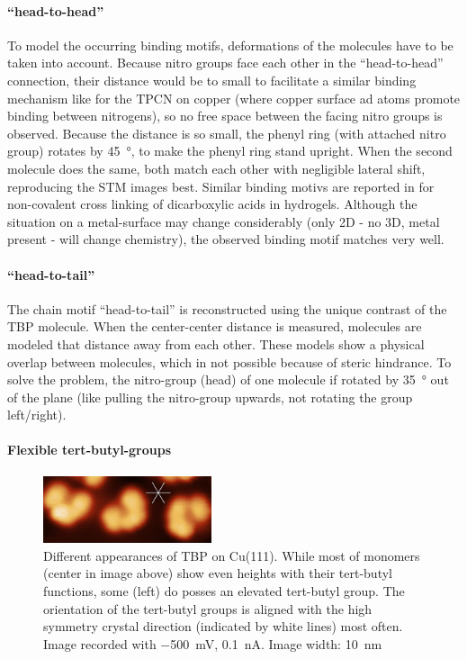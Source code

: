 	\paragraph{``head-to-head''}
	To model the occurring binding motifs, deformations of the molecules have to be taken into account. Because nitro groups face each other in the ``head-to-head'' connection, their distance would be to small to facilitate a similar binding mechanism like for the TPCN on copper (where copper surface ad atoms promote binding between nitrogens), so no free space between the facing nitro groups is observed. Because the distance is so small, the phenyl ring (with attached nitro group) rotates by \SI{45}{\degree}, to make the phenyl ring stand upright. When the second molecule does the same, both match each other with negligible lateral shift, reproducing the STM images best. Similar binding motivs are reported in \cite{kato_dispersive_2008} for non-covalent cross linking of dicarboxylic acids in hydrogels. Although the situation on a metal-surface may change considerably (only 2D - no 3D, metal present - will change chemistry), the observed binding motif matches very well.
	
	\paragraph{``head-to-tail''}
	The chain motif ``head-to-tail'' is reconstructed using the unique contrast of the TBP molecule. When the center-center distance is measured, molecules are modeled that distance away from each other. These models show a physical overlap between molecules, which in not possible because of steric hindrance. To solve the problem, the nitro-group (head) of one molecule if rotated by \SI{35}{\degree} out of the plane (like pulling the nitro-group upwards, not rotating the group left/right). 
	
	
	\paragraph{Flexible tert-butyl-groups}
	\begin{figure}\centering
		\includegraphics[width=0.44\textwidth]{./images/F151128-083339-10x4-overlay.png}
		\caption{Different appearances of TBP on Cu(111). While most of monomers (center in image above) show even heights with their tert-butyl functions, some (left) do posses an elevated tert-butyl group. The orientation of the tert-butyl groups is aligned with the high symmetry crystal direction (indicated by white lines) most often. Image recorded with  \SI{-500}{\milli\volt}, \SI{0.1}{\nano\ampere}. Image width: \SI{10}{\nano \meter}}
		\label{fig:TPB-butyl-flexibility-SMT}
	\end{figure}
	

